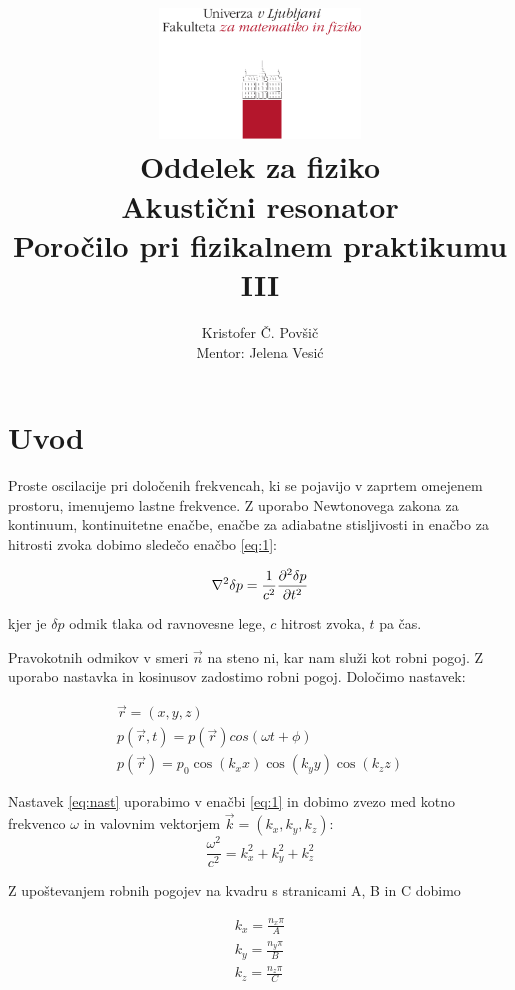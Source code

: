\documentclass[12pt]{report}
\title{
  \includegraphics[width=0.4\textwidth]{fmf_logo}\\
  {\small Oddelek za fiziko} \\
  {Akustični resonator}\\
  {\small Poročilo pri fizikalnem praktikumu III}\\

}
\date{}
\author{ Kristofer Č. Povšič \\[5 cm]
 \small  Mentor: Jelena Vesić\\
}
\begin{document}
\setcounter{page}{2}

\maketitle

\chapter*{Uvod}

Proste oscilacije pri določenih frekvencah, ki se pojavijo v zaprtem omejenem prostoru, imenujemo lastne frekvence. Z uporabo Newtonovega zakona za kontinuum, kontinuitetne enačbe, enačbe za adiabatne stisljivosti in enačbo za hitrosti zvoka dobimo sledečo enačbo \ref{eq:1}:

\begin{equation}\label{eq:1}
  \laplacian{\delta p} = \frac{1}{c^2} \frac{\partial^2 \delta p}{\partial t^2}
\end{equation}

kjer je $\delta p$ odmik tlaka od ravnovesne lege, $c$ hitrost zvoka, $t$ pa čas. 

Pravokotnih odmikov v smeri $\vec{n}$ na steno ni, kar nam služi kot robni pogoj. Z uporabo nastavka in kosinusov zadostimo robni pogoj. Določimo nastavek: 

\begin{equation}\label{eq:nast}
  \begin{aligned}
    \vec{r} = (x, y, z) \\  
    p(\vec{r}, t) = p(\vec{r})cos(\omega t + \phi) \\
    p(\vec{r}) = p_0 \cos (k_x x) \cos (k_y y) \cos (k_z z)
  \end{aligned}
\end{equation}


Nastavek \ref{eq:nast} uporabimo v enačbi \ref{eq:1} in dobimo zvezo med kotno frekvenco $\omega$ in valovnim vektorjem $\vec{k} = (k_x, k_y, k_z)$:
\begin{equation}
  \frac{\omega^2}{c^2} = k_x^2 + k_y^2 + k_z^2
\end{equation}

Z upoštevanjem robnih pogojev na kvadru s stranicami A, B in C dobimo 

\begin{equation}
  \begin{aligned}
    k_x = \frac{n_x \pi}{A}\\
    k_y = \frac{n_y \pi}{B}\\
    k_z = \frac{n_z \pi}{C}\\
  \end{aligned}
\end{equation}
\end{document}
